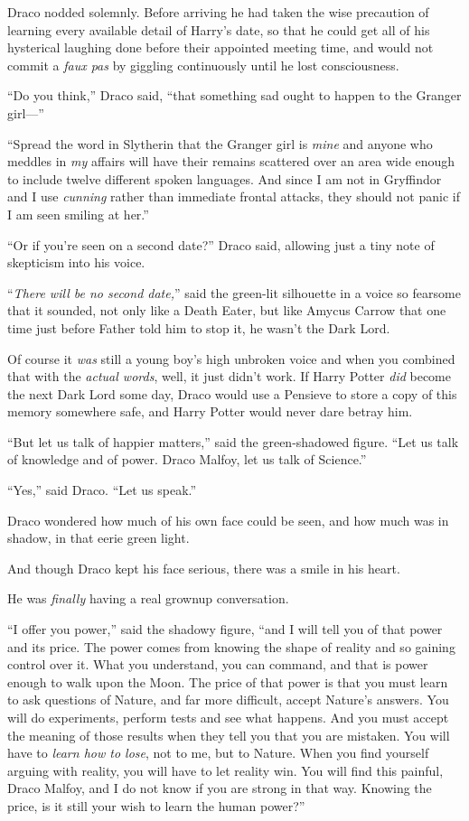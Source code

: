 Draco nodded solemnly. Before arriving he had taken the wise precaution of
learning every available detail of Harry’s date, so that he could get all of
his hysterical laughing done before their appointed meeting time, and would not
commit a \emph{faux pas} by giggling continuously until he lost consciousness.

“Do you think,” Draco said, “that something sad ought to happen to the Granger
girl—”

“Spread the word in Slytherin that the Granger girl is \emph{mine} and anyone
who meddles in \emph{my} affairs will have their remains scattered over an area
wide enough to include twelve different spoken languages. And since I am not in
Gryffindor and I use \emph{cunning} rather than immediate frontal attacks, they
should not panic if I am seen smiling at her.”

“Or if you’re seen on a second date?” Draco said, allowing just a tiny note of
skepticism into his voice.

“\emph{There will be no second date,}” said the green-lit silhouette in a voice
so fearsome that it sounded, not only like a Death Eater, but like Amycus
Carrow that one time just before Father told him to stop it, he wasn’t the Dark
Lord.

Of course it \emph{was} still a young boy’s high unbroken voice and when you
combined that with the \emph{actual words}, well, it just didn’t work. If Harry
Potter \emph{did} become the next Dark Lord some day, Draco would use a Pensieve
to store a copy of this memory somewhere safe, and Harry Potter would never
dare betray him.

“But let us talk of happier matters,” said the green-shadowed figure. “Let us
talk of knowledge and of power. Draco Malfoy, let us talk of Science.”

“Yes,” said Draco. “Let us speak.”

Draco wondered how much of his own face could be seen, and how much was in
shadow, in that eerie green light.

And though Draco kept his face serious, there was a smile in his heart.

He was \emph{finally} having a real grownup conversation.

“I offer you power,” said the shadowy figure, “and I will tell you of that
power and its price. The power comes from knowing the shape of reality and so
gaining control over it. What you understand, you can command, and that is
power enough to walk upon the Moon. The price of that power is that you must
learn to ask questions of Nature, and far more difficult, accept Nature’s
answers. You will do experiments, perform tests and see what happens. And you
must accept the meaning of those results when they tell you that you are
mistaken. You will have to \emph{learn how to lose}, not to me, but to Nature.
When you find yourself arguing with reality, you will have to let reality win.
You will find this painful, Draco Malfoy, and I do not know if you are strong
in that way. Knowing the price, is it still your wish to learn the human power?”


